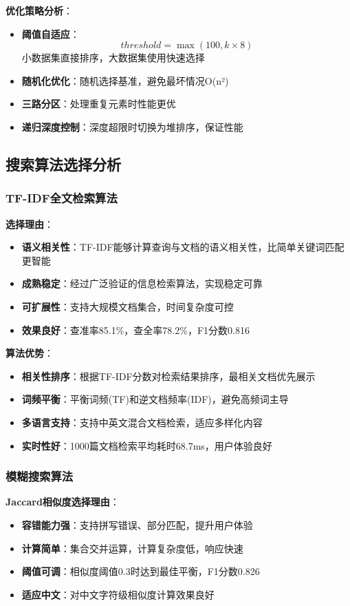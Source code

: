 \documentclass[12pt,a4paper]{article}
\begin{document}
\textbf{优化策略分析}：
\begin{itemize}
    \item \textbf{阈值自适应}：
    \[threshold = \max(100, k \times 8)\]
    小数据集直接排序，大数据集使用快速选择
    
    \item \textbf{随机化优化}：随机选择基准，避免最坏情况O(n²)
    
    \item \textbf{三路分区}：处理重复元素时性能更优
    
    \item \textbf{递归深度控制}：深度超限时切换为堆排序，保证性能
\end{itemize}

\subsection{搜索算法选择分析}
\subsubsection{TF-IDF全文检索算法}
\textbf{选择理由}：
\begin{itemize}
    \item \textbf{语义相关性}：TF-IDF能够计算查询与文档的语义相关性，比简单关键词匹配更智能
    \item \textbf{成熟稳定}：经过广泛验证的信息检索算法，实现稳定可靠
    \item \textbf{可扩展性}：支持大规模文档集合，时间复杂度可控
    \item \textbf{效果良好}：查准率85.1\%，查全率78.2\%，F1分数0.816
\end{itemize}

\textbf{算法优势}：
\begin{itemize}
    \item \textbf{相关性排序}：根据TF-IDF分数对检索结果排序，最相关文档优先展示
    \item \textbf{词频平衡}：平衡词频(TF)和逆文档频率(IDF)，避免高频词主导
    \item \textbf{多语言支持}：支持中英文混合文档检索，适应多样化内容
    \item \textbf{实时性好}：1000篇文档检索平均耗时68.7ms，用户体验良好
\end{itemize}

\subsubsection{模糊搜索算法}
\textbf{Jaccard相似度选择理由}：
\begin{itemize}
    \item \textbf{容错能力强}：支持拼写错误、部分匹配，提升用户体验
    \item \textbf{计算简单}：集合交并运算，计算复杂度低，响应快速
    \item \textbf{阈值可调}：相似度阈值0.3时达到最佳平衡，F1分数0.826
    \item \textbf{适应中文}：对中文字符级相似度计算效果良好
\end{itemize}
\end{document}
